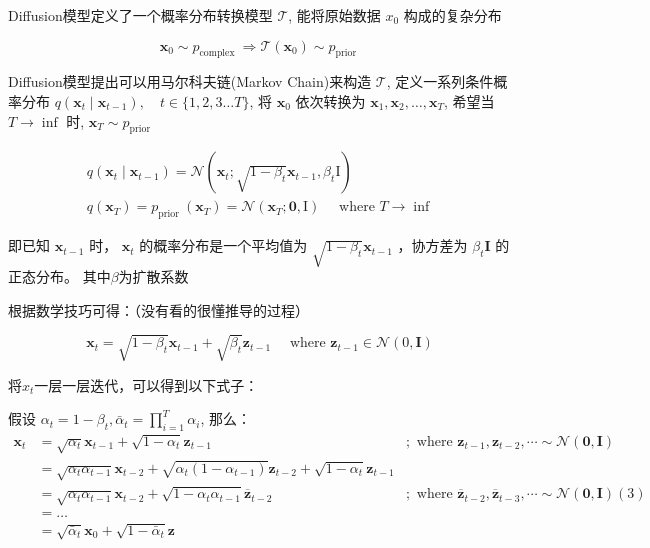 \documentclass[]{ctexart}
\begin{document}
Diffusion模型定义了一个概率分布转换模型 $\mathcal{T}$, 能将原始数据 $x_0$ 构成的复杂分布

$$
\mathbf{x}_0 \sim p_{\text {complex }} \Longrightarrow \mathcal{T}\left(\mathbf{x}_0\right) \sim p_{\text {prior }}
$$

Diffusion模型提出可以用马尔科夫链(Markov Chain)来构造 $\mathcal{T}$, 定义一系列条件概率分布 $q\left(\mathbf{x}_t \mid \mathbf{x}_{t-1}\right), \quad t \in\{1,2,3 \ldots T\}$, 
将 $\mathbf{x}_0$ 依次转换为 $\mathbf{x}_1, \mathbf{x}_2, \ldots, \mathbf{x}_T$, 希望当 $T \rightarrow \inf$ 时, $\mathbf{x}_T \sim p_{\text {prior }}$

$$
\begin{gathered}
q\left(\mathbf{x}_t \mid \mathbf{x}_{t-1}\right)=\mathcal{N}\left(\mathbf{x}_t ; \sqrt{1-\beta_t} \mathbf{x}_{t-1}, \beta_t \mathrm{I}\right) \\
q\left(\mathbf{x}_T\right)=p_{\text {prior }}\left(\mathbf{x}_T\right)=\mathcal{N}\left(\mathbf{x}_T ; \mathbf{0}, \mathrm{I}\right) \quad \text { where } T \rightarrow \inf
\end{gathered}
$$

即已知 $\mathbf{x}_{t-1}$ 时， $\mathbf{x}_t$ 的概率分布是一个平均值为 $\sqrt{1-\beta_t} \mathbf{x}_{t-1}$ ，协方差为 $\beta_t \mathbf{I}$ 的正态分布。
其中$\beta$为扩散系数

根据数学技巧可得：（没有看的很懂推导的过程）

$$
\mathbf{x}_t=\sqrt{1-\beta_t} \mathbf{x}_{t-1}+\sqrt{\beta_t} \mathbf{z}_{t-1} \quad \text { where } \mathbf{z}_{t-1} \in \mathcal{N}(0, \mathbf{I})
$$

将$x_t$一层一层迭代，可以得到以下式子：

假设 $\alpha_t=1-\beta_t, \bar{\alpha}_t=\prod_{i=1}^T \alpha_i$, 那么：
$$
\begin{array}{rlr}
\mathbf{x}_t & =\sqrt{\alpha_t} \mathbf{x}_{t-1}+\sqrt{1-\alpha_t} \mathbf{z}_{t-1} & ; \text { where } \mathbf{z}_{t-1}, \mathbf{z}_{t-2}, \cdots \sim \mathcal{N}(\mathbf{0}, \mathbf{I}) \\
& =\sqrt{\alpha_t \alpha_{t-1}} \mathbf{x}_{t-2}+\sqrt{\alpha_t\left(1-\alpha_{t-1}\right)} \mathbf{z}_{t-2}+\sqrt{1-\alpha_t} \mathbf{z}_{t-1} & \\
& =\sqrt{\alpha_t \alpha_{t-1}} \mathbf{x}_{t-2}+\sqrt{1-\alpha_t \alpha_{t-1}} \overline{\mathbf{z}}_{t-2} & ; \text { where } \overline{\mathbf{z}}_{t-2}, \overline{\mathbf{z}}_{t-3}, \cdots \sim \mathcal{N}(\mathbf{0}, \mathbf{I})(3) \\
& =\ldots & \\
& =\sqrt{\bar{\alpha}_t} \mathbf{x}_0+\sqrt{1-\bar{\alpha}_t} \mathbf{z} &
\end{array}
$$
\end{document}
